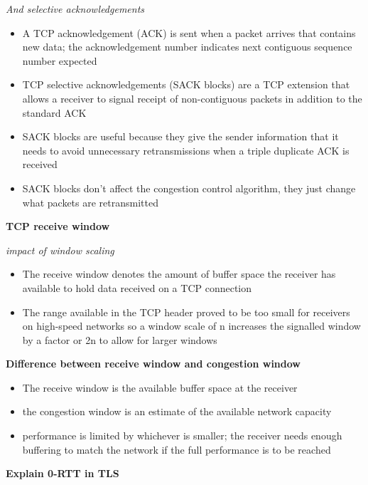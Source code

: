 \documentclass{article}
\begin{document}
\textit{And selective acknowledgements}
\begin{itemize}
    \item A TCP acknowledgement (ACK) is sent when a packet arrives that contains new data; the
    acknowledgement number indicates next contiguous sequence number expected
    \item TCP selective acknowledgements (SACK blocks) are a TCP extension that allows a receiver
    to signal receipt of non-contiguous packets in addition to the standard ACK
    \item SACK blocks are useful because they give the sender information that it needs to avoid
    unnecessary retransmissions when a triple duplicate ACK is received
    \item SACK blocks don't affect the congestion control algorithm, they just change what packets
    are retransmitted
\end{itemize}

\textbf{TCP receive window}

\textit{impact of window scaling}
\begin{itemize}
    \item The receive window denotes the amount of buffer space the receiver has available to hold
    data received on a TCP connection
    \item The range available in the TCP header proved to be too small for receivers on high-speed
    networks so a window scale of n increases the signalled window by a factor or 2n
    to allow for larger windows
\end{itemize}


\textbf{Difference between receive window and congestion window}
\begin{itemize}
    \item The receive window is the available buffer space at the receiver
    \item the congestion window is an estimate of the available network capacity
    \item performance is limited by whichever is smaller; the receiver needs enough buffering to match the network if the
    full performance is to be reached
\end{itemize}

\textbf{Explain 0-RTT in TLS}
\end{document}
